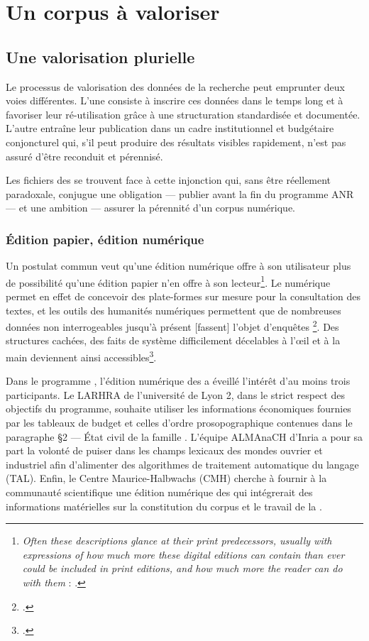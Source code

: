 \part{Un corpus à valoriser}

\clearpage
\thispagestyle{empty}
\cleardoublepage

\chapter{Une valorisation plurielle}

Le processus de valorisation des données de la recherche peut emprunter deux voies différentes. L'une consiste à inscrire ces données dans le temps long et à favoriser leur ré-utilisation grâce à une structuration standardisée et documentée. L'autre entraîne leur publication dans un cadre institutionnel et budgétaire conjoncturel qui, s'il peut produire des résultats visibles rapidement, n'est pas assuré d'être reconduit et pérennisé.

Les fichiers des \odm{} se trouvent face à cette injonction qui, sans être réellement paradoxale, conjugue une obligation --- publier avant la fin du programme ANR \timeus{} --- et une ambition --- assurer la pérennité d'un corpus numérique.

\section{Édition papier, édition numérique}

Un postulat commun veut qu'une édition numérique offre à son utilisateur plus de possibilité qu'une édition papier n'en offre à son lecteur\footnote{\og \textit{Often these descriptions glance at their print predecessors, usually with expressions of how much more these digital editions can contain than ever could be included in print editions, and how much more the reader can do with them} \fg{} : \cite[p. 105-106]{robinson}.}. Le numérique permet en effet de concevoir des plate-formes sur mesure pour la consultation des textes, et les outils des humanités numériques permettent que \og de nombreuses données non interrogeables jusqu’à présent [fassent] l’objet d’enquêtes \fg\footcite[p. 20]{duval}. \og Des structures cachées, des faits de système difficilement décelables à l’œil et à la main \fg{} deviennent ainsi accessibles\footcite{duval}.

Dans le programme \timeus{}, l'édition numérique des \odm{} a éveillé l'intérêt d'au moins trois participants. Le LARHRA de l'université de Lyon 2, dans le strict respect des objectifs du programme, souhaite utiliser les informations économiques fournies par les tableaux de budget et celles d'ordre prosopographique contenues dans le paragraphe \og §2 --- État civil de la famille \fg. L'équipe ALMAnaCH d'Inria a pour sa part la volonté de puiser dans les champs lexicaux des mondes ouvrier et industriel afin d'alimenter des algorithmes de traitement automatique du langage (TAL). Enfin, le Centre Maurice-Halbwachs (CMH) cherche à fournir à la communauté scientifique une édition numérique des \odm{} qui intégrerait des informations matérielles sur la constitution du corpus et le travail de la \sess.


